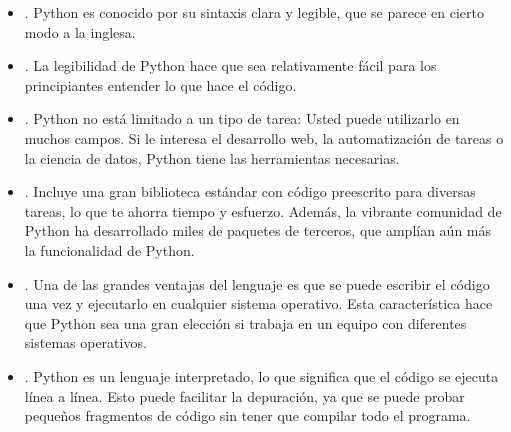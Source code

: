 \documentclass[letterpaper,10pt,spanish]{sphinxmanual}
\begin{document}
\begin{itemize}
\item {} 
\sphinxAtStartPar
{}. Python es conocido por su sintaxis clara y legible, que se parece en cierto modo a la inglesa.

\begin{sphinxVerbatim}[commandchars=\\\{\},numbers=left,firstnumber=1,stepnumber=1]

  


\end{sphinxVerbatim}

\item {} 
\sphinxAtStartPar
{}. La legibilidad de Python hace que sea relativamente fácil para los principiantes entender lo que hace el código.

\item {} 
\sphinxAtStartPar
{}. Python no está limitado a un tipo de tarea: Usted puede utilizarlo en muchos campos. Si le interesa el desarrollo web, la automatización de tareas o la ciencia de datos, Python tiene las herramientas necesarias.

\item {} 
\sphinxAtStartPar
{}. Incluye una gran biblioteca estándar con código pre\sphinxhyphen{}escrito para diversas tareas, lo que te ahorra tiempo y esfuerzo. Además, la vibrante comunidad de Python ha desarrollado miles de paquetes de terceros, que amplían aún más la funcionalidad de Python.

\item {} 
\sphinxAtStartPar
{}. Una de las grandes ventajas del lenguaje es que se puede escribir el código una vez y ejecutarlo en cualquier sistema operativo. Esta característica hace que Python sea una gran elección si trabaja en un equipo con diferentes sistemas operativos.

\item {} 
\sphinxAtStartPar
{}. Python es un lenguaje interpretado, lo que significa que el código se ejecuta línea a línea. Esto puede facilitar la depuración, ya que se puede probar pequeños fragmentos de código sin tener que compilar todo el programa.


\end{itemize}
\end{document}
